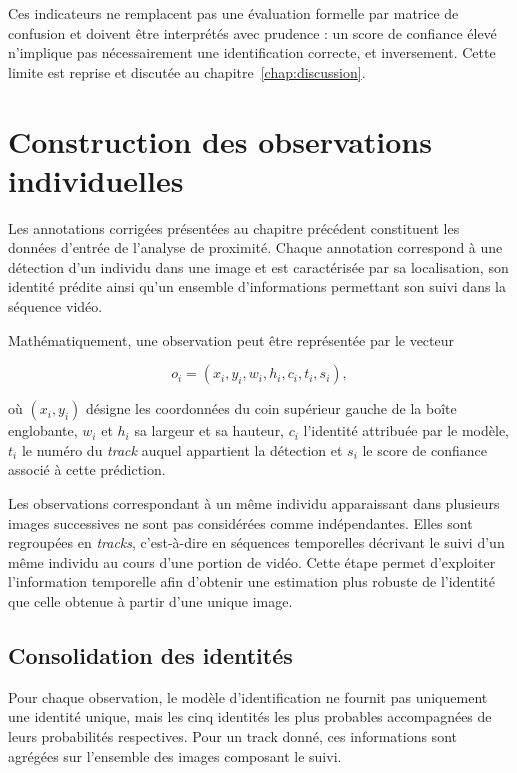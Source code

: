 \documentclass[11pt,a4paper]{report}
\begin{document}
Ces indicateurs ne remplacent pas une évaluation formelle par matrice de
confusion et doivent être interprétés avec prudence : un score de confiance
élevé n'implique pas nécessairement une identification correcte, et
inversement. Cette limite est reprise et discutée au
chapitre~\ref{chap:discussion}.


\section{Construction des observations individuelles}
\label{sec:construction_observations}

Les annotations corrigées présentées au chapitre précédent constituent les
données d'entrée de l'analyse de proximité. Chaque annotation correspond à une
détection d'un individu dans une image et est caractérisée par sa localisation,
son identité prédite ainsi qu'un ensemble d'informations permettant son suivi
dans la séquence vidéo.

Mathématiquement, une observation peut être représentée par le vecteur

\begin{equation}
o_i=
\left(
x_i,
y_i,
w_i,
h_i,
c_i,
t_i,
s_i
\right),
\end{equation}

où $(x_i,y_i)$ désigne les coordonnées du coin supérieur gauche de la boîte
englobante, $w_i$ et $h_i$ sa largeur et sa hauteur, $c_i$ l'identité attribuée
par le modèle, $t_i$ le numéro du \emph{track} auquel appartient la détection et
$s_i$ le score de confiance associé à cette prédiction.

Les observations correspondant à un même individu apparaissant dans plusieurs
images successives ne sont pas considérées comme indépendantes. Elles sont
regroupées en \emph{tracks}, c'est-à-dire en séquences temporelles décrivant le
suivi d'un même individu au cours d'une portion de vidéo. Cette étape permet
d'exploiter l'information temporelle afin d'obtenir une estimation plus robuste
de l'identité que celle obtenue à partir d'une unique image.

\subsection*{Consolidation des identités}

Pour chaque observation, le modèle d'identification ne fournit pas uniquement
une identité unique, mais les cinq identités les plus probables accompagnées de
leurs probabilités respectives. Pour un track donné, ces informations sont
agrégées sur l'ensemble des images composant le suivi.
\end{document}
